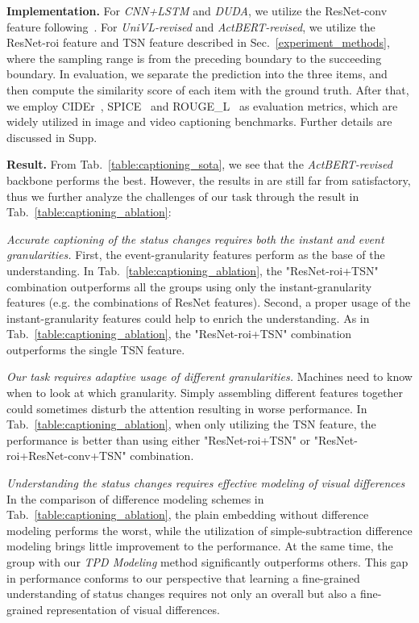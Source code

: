 \documentclass[runningheads]{llncs}
\begin{document}
%
 \textbf{Implementation.}
For \textit{CNN+LSTM} and \textit{DUDA}, we utilize the ResNet-conv feature following~\cite{park2019robust}. For \textit{UniVL-revised} and \textit{ActBERT-revised}, we utilize the ResNet-roi feature and TSN feature described in Sec.~\ref{experiment_methods}, where the sampling range is from the preceding boundary to the succeeding boundary. 
In evaluation, we separate the prediction into the three items, and then compute the similarity score of each item with the ground truth. After that, we employ CIDEr~\cite{vedantam2015cider}, SPICE~\cite{anderson2016spice} and ROUGE\_L~\cite{lin2004rouge} as evaluation metrics, which are widely utilized in image and video captioning benchmarks. Further details are discussed in Supp.


\textbf{Result.}
From Tab.~\ref{table:captioning_sota}, we see that the \textit{ActBERT-revised} backbone performs the best. However, the results in are still far from satisfactory, thus we further analyze the challenges of our task through the result in Tab.~\ref{table:captioning_ablation}:

\textit{Accurate captioning of the status changes requires both the instant and event granularities.} First, the event-granularity features perform as the base of the understanding. In Tab.~\ref{table:captioning_ablation}, the "ResNet-roi+TSN" combination outperforms all the groups using only the instant-granularity features (e.g. the combinations of ResNet features). Second, a proper usage of the instant-granularity features could help to enrich the understanding. 
As in Tab.~\ref{table:captioning_ablation}, the "ResNet-roi+TSN" combination outperforms the single TSN feature.

\textit{Our task requires adaptive usage of different granularities.} Machines need to know when to look at which granularity. Simply assembling different features together could sometimes disturb the attention resulting in worse performance. 
In Tab.~\ref{table:captioning_ablation}, when only utilizing the TSN feature, the performance is better than using either "ResNet-roi+TSN" or "ResNet-roi+ResNet-conv+TSN" combination. 


\textit{Understanding the status changes requires effective modeling of visual differences} In the comparison of difference modeling schemes in Tab.~\ref{table:captioning_ablation}, the plain embedding without difference modeling performs the worst, while the utilization of simple-subtraction difference modeling brings little improvement to the performance. At the same time, the group with our \textit{TPD Modeling} method significantly outperforms others. This gap in performance conforms to our perspective that learning a fine-grained understanding of status changes requires not only an overall but also a fine-grained representation of visual differences. 
\end{document}
